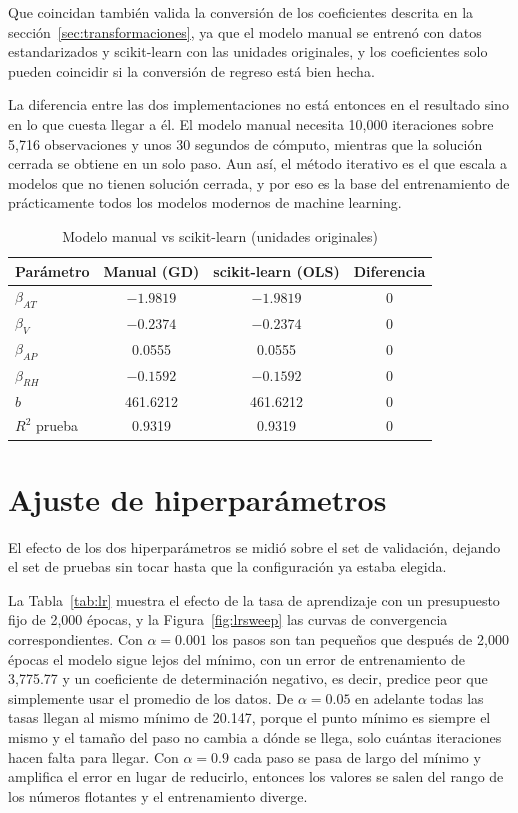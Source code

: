 \documentclass[conference]{IEEEtran}
\begin{document}
Que coincidan también valida la conversión de los coeficientes descrita en la sección~\ref{sec:transformaciones}, ya que el modelo manual se entrenó con datos estandarizados y scikit-learn con las unidades originales, y los coeficientes solo pueden coincidir si la conversión de regreso está bien hecha.

La diferencia entre las dos implementaciones no está entonces en el resultado sino en lo que cuesta llegar a él. El modelo manual necesita 10,000 iteraciones sobre 5,716 observaciones y unos 30 segundos de cómputo, mientras que la solución cerrada se obtiene en un solo paso. Aun así, el método iterativo es el que escala a modelos que no tienen solución cerrada, y por eso es la base del entrenamiento de prácticamente todos los modelos modernos de machine learning.

\begin{table}[htbp]
\caption{Modelo manual vs scikit-learn (unidades originales)}
\label{tab:comparacion}
\centering
\begin{tabular}{lccc}
\toprule
Parámetro & Manual (GD) & scikit-learn (OLS) & Diferencia \\
\midrule
$\beta_{AT}$ & $-1.9819$ & $-1.9819$ & 0 \\
$\beta_{V}$ & $-0.2374$ & $-0.2374$ & 0 \\
$\beta_{AP}$ & 0.0555 & 0.0555 & 0 \\
$\beta_{RH}$ & $-0.1592$ & $-0.1592$ & 0 \\
$b$ & 461.6212 & 461.6212 & 0 \\
$R^2$ prueba & 0.9319 & 0.9319 & 0 \\
\bottomrule
\end{tabular}
\end{table}

\section{Ajuste de hiperparámetros}
\label{sec:hiperparametros}
El efecto de los dos hiperparámetros se midió sobre el set de validación, dejando el set de pruebas sin tocar hasta que la configuración ya estaba elegida.

La Tabla~\ref{tab:lr} muestra el efecto de la tasa de aprendizaje con un presupuesto fijo de 2,000 épocas, y la Figura~\ref{fig:lrsweep} las curvas de convergencia correspondientes. Con $\alpha = 0.001$ los pasos son tan pequeños que después de 2,000 épocas el modelo sigue lejos del mínimo, con un error de entrenamiento de 3,775.77 y un coeficiente de determinación negativo, es decir, predice peor que simplemente usar el promedio de los datos. De $\alpha = 0.05$ en adelante todas las tasas llegan al mismo mínimo de 20.147, porque el punto mínimo es siempre el mismo y el tamaño del paso no cambia a dónde se llega, solo cuántas iteraciones hacen falta para llegar. Con $\alpha = 0.9$ cada paso se pasa de largo del mínimo y amplifica el error en lugar de reducirlo, entonces los valores se salen del rango de los números flotantes y el entrenamiento diverge.
\end{document}

